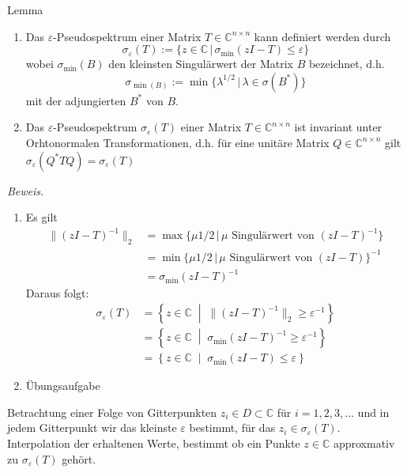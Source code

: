 \begin{thmbox}{Lemma}
    \begin{enumerate}
        \item Das $\varepsilon$-Pseudospektrum einer Matrix $T\in\mathbb{C}^{n\times n}$ kann definiert werden 
            durch
            \[\sigma_\varepsilon(T) := \{z\in\mathbb{C}\,|\,\sigma_{\min}(zI-T)\leq\varepsilon\}\]
            wobei $\sigma_{\min}(B)$ den kleinsten Singulärwert der Matrix $B$ bezeichnet, d.h. 
            \[\sigma_{\min(B)}:=\min\{\lambda^{1/2}\,|\,\lambda\in\sigma(B^*)\}\]
            mit der adjungierten $B^*$ von $B$.
        \item Das $\varepsilon$-Pseudospektrum $\sigma_\varepsilon(T)$ einer Matrix $T\in\mathbb{C}^{n\times n}$ ist 
            invariant unter Orhtonormalen Transformationen, d.h. für eine unitäre Matrix $Q\in\mathbb{C}^{n\times n}$ 
            gilt $\sigma_\varepsilon(Q^*TQ) = \sigma_\varepsilon(T)$
    \end{enumerate}
\end{thmbox}
\textit{Beweis.} 
\begin{enumerate}
    \item Es gilt
        \begin{align*}
            \|(zI-T)^{-1}\|_2 
            &= \max\{\mu{1/2}\,|\, \mu \text{ Singulärwert von } (zI-T)^{-1}\}  \\
            &= \min\{\mu{1/2}\,|\, \mu \text{ Singulärwert von } (zI-T)\}^{-1} \\
            &= \sigma_{\min}(zI-T)^{-1}
        \end{align*}
        Daraus folgt:
        \begin{align*}
            \sigma_\varepsilon(T) 
            &= \left\{ z \in \mathbb{C} \;\middle|\; \|(zI-T)^{-1}\|_2 \geq \varepsilon^{-1} \right\} \\
            &= \left\{ z \in \mathbb{C} \;\middle|\; \sigma_{\min}(zI-T)^{-1} \geq \varepsilon^{-1} \right\} \\
            &= \left\{ z \in \mathbb{C} \;\middle|\; \sigma_{\min}(zI-T) \leq \varepsilon \right\}
        \end{align*}
    \item Übungsaufgabe
\end{enumerate}

Betrachtung einer Folge von Gitterpunkten $z_i\in D\subset \mathbb{C}$ für $i=1,2,3,\dots$ und in jedem Gitterpunkt
wir das kleinste $\varepsilon$ bestimmt, für das $z_i\in\sigma_\varepsilon(T)$. \\
Interpolation der erhaltenen Werte, bestimmt ob ein Punkte $z\in\mathbb{C}$ approxmativ zu $\sigma_\varepsilon(T)$ gehört.
